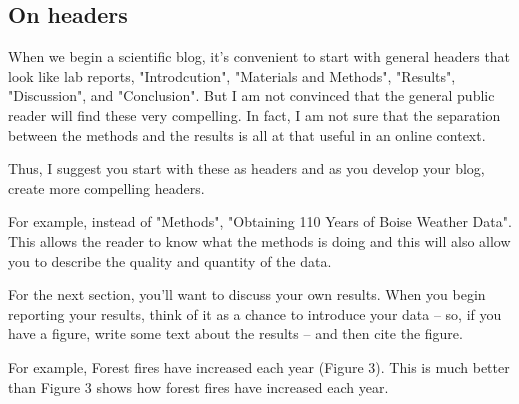 \documentclass{tufte-handout}\usepackage[]{graphicx}\usepackage[]{color}
\begin{document}
\subsection{On headers}

When we begin a scientific blog, it's convenient to start with general headers that look like lab reports, "Introdcution", "Materials and Methods", "Results", "Discussion", and "Conclusion". But I am not convinced that the general public reader will find these very compelling. In fact, I am not sure that the separation between the methods and the results is all at that useful in an online context. 

Thus, I suggest you start with these as headers and as you develop your blog, create more compelling headers. 

For example, instead of "Methods", "Obtaining 110 Years of Boise Weather Data". This allows the reader to know what the methods is doing and this will also allow you to describe the quality and quantity of the data. 

For the next section, you'll want to discuss your own results. When you begin reporting your results, think of it as a chance to introduce your data -- so, if you have a figure, write some text about the results -- and then cite the figure.

For example, Forest fires have increased each year (Figure 3). 
This is much better than Figure 3 shows how forest fires have increased each year. 






\end{document}
